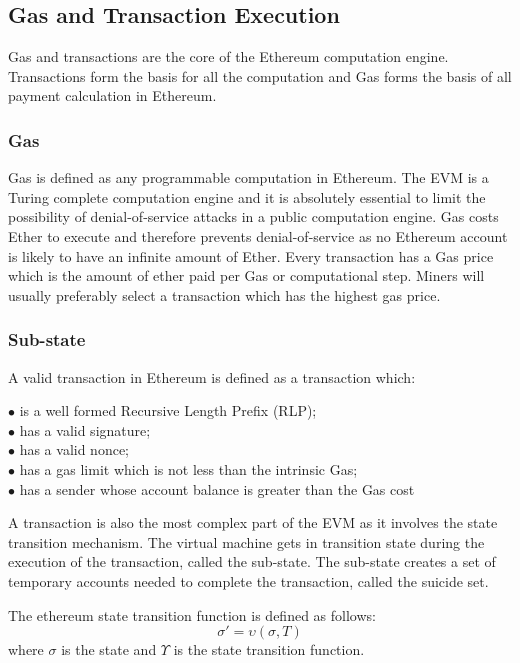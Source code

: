 \documentclass[a4paper,twoside,phd]{BYUPhys}
\begin{document}
\subsection{Gas and Transaction Execution}
Gas and transactions are the core of the Ethereum computation engine. Transactions form the basis for all the computation and Gas forms the basis of all payment calculation in Ethereum.
\subsubsection{Gas}
Gas is defined as any programmable computation in Ethereum\cite{}. The EVM is a Turing complete computation engine and it is absolutely essential to limit the possibility of denial-of-service attacks in a public computation engine. Gas costs Ether to execute and therefore prevents denial-of-service as no Ethereum account is likely to have an infinite amount of Ether. Every transaction has a Gas price which is the amount of ether paid per Gas or computational step. Miners will usually preferably select a transaction which has the highest gas price.
\subsubsection{Sub-state}
A valid transaction in Ethereum is defined as a transaction which\cite{}:
\begin{description}
\item [$\bullet$ is a well formed Recursive Length Prefix (RLP);]
\item [$\bullet$ has a valid signature;]
\item [$\bullet$ has a valid nonce;]
\item [$\bullet$ has a gas limit which is not less than the intrinsic Gas;]
\item [$\bullet$ has a sender whose account balance is greater than the Gas cost]
\end{description}

A transaction is also the most complex part of the EVM as it involves the state transition mechanism. The virtual machine gets in transition state during the execution of the transaction, called the sub-state\cite{}. The sub-state creates a set of temporary accounts needed to complete the transaction, called the suicide set.

The ethereum state transition function is defined as follows\cite{}: \[\sigma' = \upsilon(\sigma, T)\]
where $\sigma$ is the state and $\Upsilon$ is the state transition function.
\end{document}
